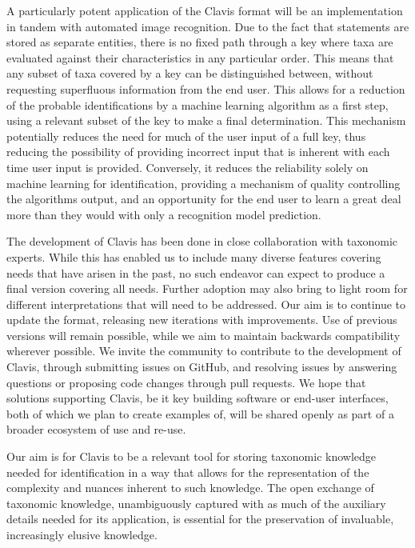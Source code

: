 \documentclass[10pt,letterpaper]{article}
\begin{document}
A particularly potent application of the Clavis format will be an implementation in tandem with automated image recognition. Due to the fact that statements are stored as separate entities, there is no fixed path through a key where taxa are evaluated against their characteristics in any particular order. This means that any subset of taxa covered by a key can be distinguished between, without requesting superfluous information from the end user. This allows for a reduction of the probable identifications by a machine learning algorithm as a first step, using a relevant subset of the key to make a final determination. This mechanism potentially reduces the need for much of the user input of a full key, thus reducing the possibility of providing incorrect input that is inherent with each time user input is provided. Conversely, it reduces the reliability solely on machine learning for identification, providing a mechanism of quality controlling the algorithms output, and an opportunity for the end user to learn a great deal more than they would with only a recognition model prediction.

The development of Clavis has been done in close collaboration with taxonomic experts. While this has enabled us to include many diverse features covering needs that have arisen in the past, no such endeavor can expect to produce a final version covering all needs. Further adoption may also bring to light room for different interpretations that will need to be addressed. Our aim is to continue to update the format, releasing new iterations with improvements. Use of previous versions will remain possible, while we aim to maintain backwards compatibility wherever possible. We invite the community to contribute to the development of Clavis, through submitting issues on GitHub, and resolving issues by answering questions or proposing code changes through pull requests. We hope that solutions supporting Clavis, be it key building software or end-user interfaces, both of which we plan to create examples of, will be shared openly as part of a broader ecosystem of use and re-use.

Our aim is for Clavis to be a relevant tool for storing taxonomic knowledge needed for identification in a way that allows for the representation of the complexity and nuances inherent to such knowledge. The open exchange of taxonomic knowledge, unambiguously captured with as much of the auxiliary details needed for its application, is essential for the preservation of invaluable, increasingly elusive knowledge.
\end{document}
